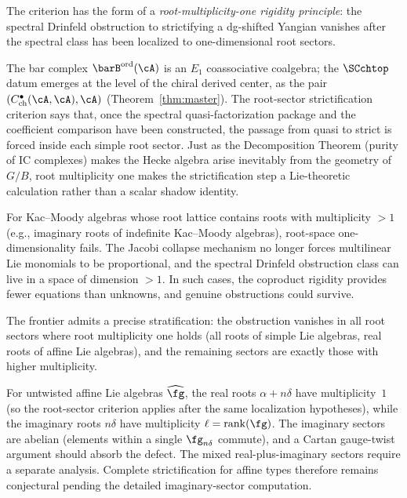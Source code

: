 \begin{remark}
The criterion has the form of a
\emph{root-multiplicity-one rigidity principle}: the spectral
Drinfeld obstruction to strictifying a dg-shifted Yangian vanishes
after the spectral class has been localized to one-dimensional root
sectors.

The bar complex $\barB^{\mathrm{ord}}(\cA)$ is an $E_1$ coassociative
coalgebra; the $\SCchtop$ datum emerges at the level of the chiral
derived center, as the pair $(C^\bullet_{\mathrm{ch}}(\cA,\cA),\cA)$
(Theorem~\ref{thm:master}). The root-sector strictification criterion
says that, once the spectral quasi-factorization package and the
coefficient comparison have been constructed, the passage from quasi
to strict is forced inside each simple root sector. Just as the
Decomposition Theorem (purity of IC complexes) makes the Hecke algebra
arise inevitably from the geometry of $G/B$, root multiplicity one
makes the strictification step a Lie-theoretic calculation rather
than a scalar shadow identity.
\end{remark}

\begin{remark}
\label{rem:kac-moody-failure}
For Kac--Moody algebras whose root lattice contains roots with
multiplicity $>1$ (e.g., imaginary roots of indefinite Kac--Moody
algebras), root-space one-dimensionality fails. The Jacobi collapse
mechanism no longer forces multilinear Lie monomials to be
proportional, and the spectral Drinfeld obstruction class can live in
a space of dimension $>1$. In such cases, the coproduct rigidity
provides fewer equations than unknowns, and genuine obstructions
could survive.

The frontier admits a precise stratification: the obstruction vanishes
in all root sectors where root multiplicity one holds (all roots of
simple Lie algebras, real roots of affine Lie algebras), and the
remaining sectors are exactly those with higher multiplicity.

For untwisted affine Lie algebras $\widehat\fg$, the real roots
$\alpha+n\delta$ have multiplicity~$1$ (so the root-sector criterion
applies after the same localization hypotheses), while the imaginary roots $n\delta$ have
multiplicity $\ell=\operatorname{rank}(\fg)$. The imaginary sectors
are abelian (elements within a single $\fg_{n\delta}$ commute), and
a Cartan gauge-twist argument should absorb the defect. The mixed
real-plus-imaginary sectors require a separate analysis. Complete
strictification for affine types therefore remains conjectural pending
the detailed imaginary-sector computation.
\end{remark}


